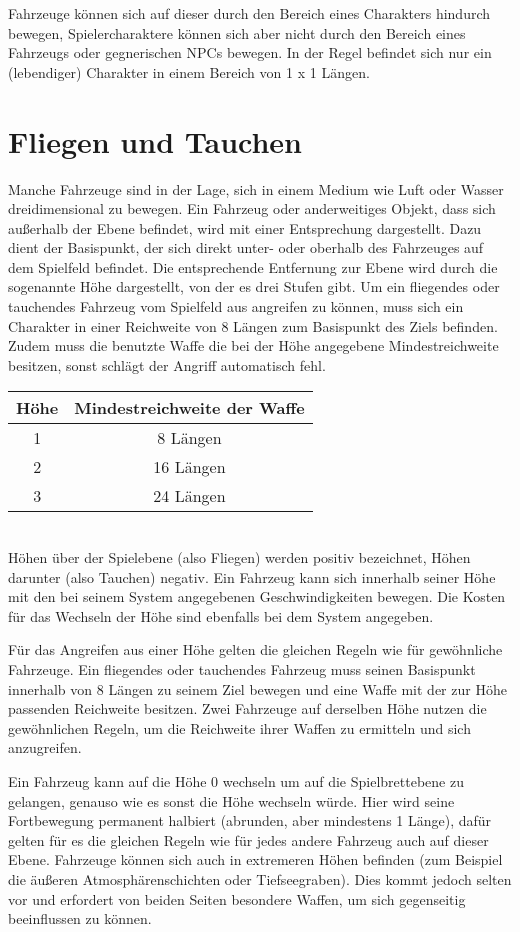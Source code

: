 Fahrzeuge können sich auf dieser durch den Bereich eines Charakters hindurch bewegen, Spielercharaktere können sich aber nicht durch den Bereich eines Fahrzeugs oder gegnerischen NPCs bewegen. In der Regel befindet sich nur ein (lebendiger) Charakter in einem Bereich von 1 x 1 Längen.
\section{Fliegen und Tauchen}
Manche Fahrzeuge sind in der Lage, sich in einem Medium wie Luft oder Wasser dreidimensional zu bewegen. Ein Fahrzeug oder anderweitiges Objekt, dass sich außerhalb der \glqq Ebene\grqq{} befindet, wird mit einer Entsprechung dargestellt. Dazu dient der Basispunkt, der sich direkt unter- oder oberhalb des Fahrzeuges auf dem \glqq Spielfeld\grqq{} befindet. Die entsprechende Entfernung zur Ebene wird durch die sogenannte \glqq Höhe\grqq{} dargestellt, von der es drei Stufen gibt. Um ein fliegendes oder tauchendes Fahrzeug vom \glqq Spielfeld\grqq{} aus angreifen zu können, muss sich ein Charakter in einer Reichweite von 8 Längen zum Basispunkt des Ziels befinden. Zudem muss die benutzte Waffe die bei der Höhe angegebene Mindestreichweite besitzen, sonst schlägt der Angriff automatisch fehl.
\\
\begin{tabular}{c|c}
Höhe & Mindestreichweite der Waffe \\
\hline
1 & 8 Längen \\
2 & 16 Längen \\
3 & 24 Längen \\
\end{tabular}
\\
Höhen über der \glqq Spielebene\grqq{} (also Fliegen) werden positiv bezeichnet, Höhen darunter (also Tauchen) negativ. Ein Fahrzeug kann sich innerhalb seiner Höhe mit den bei seinem System angegebenen Geschwindigkeiten bewegen. Die Kosten für das Wechseln der Höhe sind ebenfalls bei dem System angegeben.

Für das Angreifen aus einer Höhe gelten die gleichen Regeln wie für gewöhnliche Fahrzeuge. Ein fliegendes oder tauchendes Fahrzeug muss seinen Basispunkt innerhalb von 8 Längen zu seinem Ziel bewegen und eine Waffe mit der zur Höhe passenden Reichweite besitzen. Zwei Fahrzeuge auf derselben Höhe nutzen die gewöhnlichen Regeln, um die Reichweite ihrer Waffen zu ermitteln und sich anzugreifen.

Ein Fahrzeug kann auf die \glqq Höhe 0\grqq{} wechseln um auf die \glqq Spielbrettebene\grqq{} zu gelangen, genauso wie es sonst die Höhe wechseln würde. Hier wird seine Fortbewegung permanent halbiert (abrunden, aber mindestens 1 Länge), dafür gelten für es die gleichen Regeln wie für jedes andere Fahrzeug auch auf dieser Ebene. Fahrzeuge können sich auch in extremeren Höhen befinden (zum Beispiel die äußeren Atmosphärenschichten oder Tiefseegraben). Dies kommt jedoch selten vor und erfordert von beiden Seiten besondere Waffen, um sich gegenseitig beeinflussen zu können.


